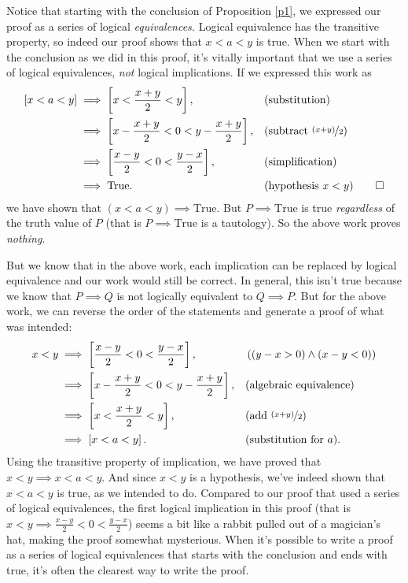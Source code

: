 \documentclass[12pt,fleqn]{article}
\newcommand{\true}{\mathrm{True}}
\newcounter{ex}\setcounter{ex}{0}
\begin{document}
Notice that starting with the conclusion of Proposition \ref{p1}, we expressed our proof as a series of logical \emph{equivalences.}  Logical
equivalence has the transitive property, so indeed our proof shows that $x < a < y$ is true.  
When we start with the conclusion as we did in this proof, it's vitally important that we use a series of  logical equivalences, \emph{not}
logical implications. If we expressed this work as
 \begin{align*}
      \left[ x < a < y \right] 
          &\implies \left[ x < \frac{x+y}{2} < y \right], &&\text{(substitution)} \\
          &\implies  \left[ x - \frac{x+y}{2} < 0 < y - \frac{x+y}{2}  \right], &&\text{(subtract $\nicefrac{(x+y)}{2}$)} \\
          &\implies  \left[ \frac{x-y}{2} < 0 < \frac{y-x}{2}  \right], &&\text{(simplification)} \\
          &\implies \true. && \text{(hypothesis $x < y$)} \qedhere
    \end{align*} 
we have shown that  $(x < a < y) \implies \true$. But $P \implies \true$ is
true \emph{regardless} of the truth value of $P$ (that is $P \implies \true$ is a 
tautology). So the above work proves \emph{nothing}. 

But we know that in the above work, each implication can be replaced by logical
equivalence and our work would still be correct. In general, this isn't true 
because we know that $P \implies Q$ is not logically equivalent to $Q \implies P$.
But for the above work, we can reverse the order of the 
statements and generate a proof of what was intended:
 \begin{align*}
    x < y  &\implies  \left[ \frac{x-y}{2} < 0 < \frac{y-x}{2}  \right], && \left((y-x > 0) \land  (x-y < 0) \right) \\
             &\implies   \left[ x - \frac{x+y}{2} < 0 < y - \frac{x+y}{2}  \right], &&\text{(algebraic equivalence)} \\
             &\implies \left[ x < \frac{x+y}{2} < y  \right], &&\text{(add $\nicefrac{(x+y)}{2}$)} \\
             &\implies \left[ x < a < y  \right].  &&\text{(substitution for $a$)}.
 \end{align*} 
 Using the transitive property of implication, we have proved that $x < y \implies x < a < y  $. And since $x < y$ is a hypothesis, we've indeed shown that $ x < a < y $ is true,
as we intended to do. Compared to our proof that used a series of logical equivalences,  the first logical implication in this proof 
(that is $x < y \implies 
 \frac{x-y}{2} < 0 < \frac{y-x}{2} $) seems a bit like a rabbit pulled out of a magician's hat, making the proof somewhat mysterious.
 When it's possible to write a proof as a series of logical equivalences that starts with the conclusion and ends with true, it's often 
 the clearest way to write the proof. 
\end{document}
